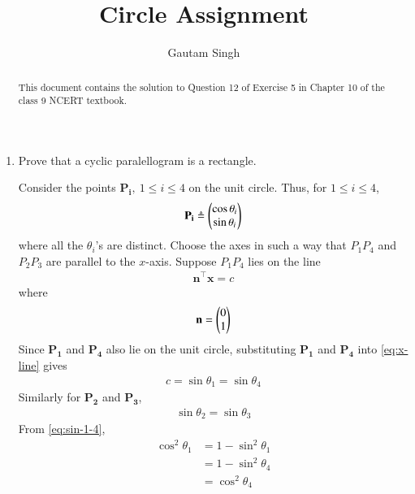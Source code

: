 \documentclass[journal,12pt,twocolumn]{IEEEtran}
\renewcommand{\vec}[1]{\boldsymbol{\mathbf{#1}}}
\begin{document}
\vspace{3cm}
\title{Circle Assignment}
\author{Gautam Singh}
\maketitle
\bigskip

\begin{abstract}
    This document contains the solution to Question 12 of 
    Exercise 5 in Chapter 10 of the class 9 NCERT textbook.
\end{abstract}

\begin{enumerate}
    \item Prove that a cyclic paralellogram is a rectangle.

    \solution Consider the points $\vec{P_i},\ 1 \le i \le 4$ on the 
    unit circle. Thus, for $1 \le i \le 4$,
    \begin{align}
        \vec{P_i} \triangleq \myvec{\cos\theta_i\\\sin\theta_i}
        \label{eq:vec-form}
    \end{align}
    where all the $\theta_i$'s are distinct. Choose the axes in such a way that 
    $P_1P_4$ and $P_2P_3$ are parallel to the $x$-axis. Suppose $P_1P_4$ lies 
    on the line
    \begin{align}
        \vec{n}^\top\vec{x} = c
        \label{eq:x-line}
    \end{align}
    where
    \begin{align}
        \vec{n} = \myvec{0\\1}
    \end{align}
    Since $\vec{P_1}$ and $\vec{P_4}$ also lie on the unit circle, substituting
    $\vec{P_1}$ and $\vec{P_4}$ into \eqref{eq:x-line} gives
    \begin{align}
        c = \sin\theta_1 = \sin\theta_4
        \label{eq:sin-1-4}
    \end{align}
    Similarly for $\vec{P_2}$ and $\vec{P_3}$,
    \begin{align}
        \sin\theta_2 = \sin\theta_3
        \label{eq:sin-2-3}
    \end{align}
    From \eqref{eq:sin-1-4},
    \begin{align}
        \cos^2\theta_1 &= 1 - \sin^2\theta_1 \\
                       &= 1 - \sin^2\theta_4 \\
                       &= \cos^2\theta_4
    \end{align}

\end{enumerate}
\end{document}
